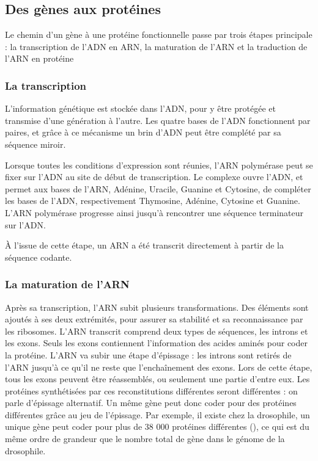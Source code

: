 \subsection{Des gènes aux protéines}

Le chemin d'un gène à une protéine fonctionnelle passe par trois étapes principale : la transcription de l'ADN en ARN, la maturation de l'ARN et la traduction de l'ARN en protéine 

\subsubsection{La transcription}

L'information génétique est stockée dans l'ADN, pour y être protégée et transmise d'une génération à l'autre. Les quatre bases de l'ADN fonctionnent par paires, et grâce à ce mécanisme un brin d'ADN peut être complété par sa séquence miroir. 

Lorsque toutes les conditions d'expression sont réunies, l'ARN polymérase peut se fixer sur l'ADN au site de début de transcription. Le complexe ouvre l'ADN, et permet aux bases de l'ARN, Adénine, Uracile, Guanine et Cytosine, de compléter les bases de l'ADN, respectivement Thymosine, Adénine, Cytosine et Guanine. L'ARN polymérase progresse ainsi jusqu'à rencontrer une séquence terminateur sur l'ADN. 

À l'issue de cette étape, un ARN a été transcrit directement à partir de la séquence codante. 

\subsubsection{La maturation de l'ARN}

Après sa transcription, l'ARN subit plusieurs transformations. Des éléments sont ajoutés à ses deux extrémités, pour assurer sa stabilité et sa reconnaissance par les ribosomes. 
L'ARN transcrit comprend deux types de séquences, les introns et les exons. Seuls les exons contiennent l'information des acides aminés pour coder la protéine. 
L'ARN va subir une étape d'épissage : les introns sont retirés de l'ARN jusqu'à ce qu'il ne reste que l'enchaînement des exons. Lors de cette étape, tous les exons peuvent être réassemblés, ou seulement une partie d'entre eux. Les protéines synthétisées par ces reconstitutions différentes seront différentes : on parle d'épissage alternatif. 
Un même gène peut donc coder pour des protéines différentes grâce au jeu de l'épissage. Par exemple, il existe chez la drosophile, un unique gène peut coder pour plus de 38 000 protéines différentes (\cite{schmucker_drosophila_2000}), ce qui est du même ordre de grandeur que le nombre total de gène dans le génome de la drosophile. 

